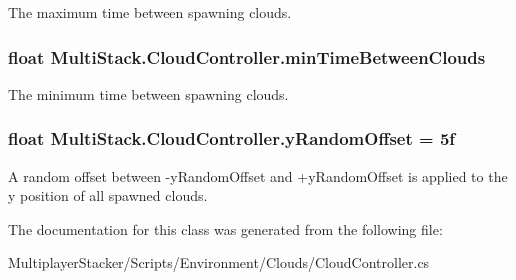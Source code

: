 The maximum time between spawning clouds. 

\hypertarget{class_multi_stack_1_1_cloud_controller_ab1e3aada1f33156adbdbc3fee236d469}{}
\subsubsection[{min\+Time\+Between\+Clouds}]{\setlength{\rightskip}{0pt plus 5cm}float Multi\+Stack.\+Cloud\+Controller.\+min\+Time\+Between\+Clouds}\label{class_multi_stack_1_1_cloud_controller_ab1e3aada1f33156adbdbc3fee236d469}


The minimum time between spawning clouds. 

\hypertarget{class_multi_stack_1_1_cloud_controller_a4315b10736e5440d071a4ffdc67e27fe}{}
\subsubsection[{y\+Random\+Offset}]{\setlength{\rightskip}{0pt plus 5cm}float Multi\+Stack.\+Cloud\+Controller.\+y\+Random\+Offset = 5f}\label{class_multi_stack_1_1_cloud_controller_a4315b10736e5440d071a4ffdc67e27fe}


A random offset between -\/y\+Random\+Offset and +y\+Random\+Offset is applied to the y position of all spawned clouds. 



The documentation for this class was generated from the following file\+:\begin{DoxyCompactItemize}
\item 
Multiplayer\+Stacker/\+Scripts/\+Environment/\+Clouds/Cloud\+Controller.\+cs\end{DoxyCompactItemize}
